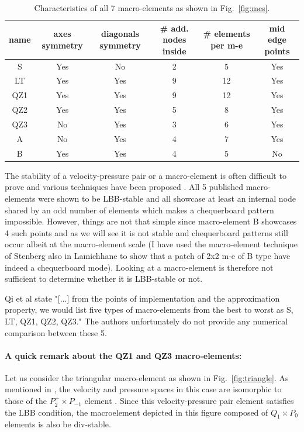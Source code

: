 \documentclass[a4paper]{article}
\begin{document}
\begin{table}
\centering
\begin{tabular}{cccccc}
\hline
{name} & {axes symmetry}  & {diagonals symmetry} & {\# add. nodes inside} 
& {\# elements per m-e} & {mid edge points}  \\
\hline
\hline
S   &  Yes &   No & 2  & 5 & Yes \\
LT  &  Yes &  Yes & 9 & 12 & Yes \\
QZ1 &  Yes &  Yes & 9 & 12 & Yes \\
QZ2 &  Yes &  Yes & 5 & 8  & Yes \\
QZ3 &  No  &  Yes & 3 & 6  & Yes \\
A   &  No  &  Yes & 4 & 7  & Yes \\
B   &  Yes &  Yes & 4 & 5  & No  \\
\hline
\end{tabular}
\caption{Characteristics of all 7 macro-elements as shown in Fig.~\ref{fig:mes}.\label{tab1}}%
\end{table}


The stability of a velocity-pressure pair or a macro-element is often difficult to prove 
and various techniques have been proposed \cite{bobf13}. 
All 5 published macro-elements were shown to be LBB-stable and all showcase at least 
an internal node shared by an odd number of elements which makes a chequerboard pattern impossible. 
However, things are not that simple since macro-element B showcases 
4 such points and as we will see it is not stable and chequerboard patterns still occur 
albeit at the macro-element scale (I have used the macro-element technique of Stenberg 
also in Lamichhane to show that a patch of 2x2 m-e of B type have indeed a chequerboard mode).
Looking at a macro-element is therefore not sufficient to determine whether it is LBB-stable or not. 

Qi et al \cite{qizh07} state "[...] from the points of implementation and the approximation property, we 
would list five types of macro-elements from the best to worst as S, LT, QZ1, QZ2, QZ3." 
The authors unfortunately do not provide any numerical comparison between these 5. 

\paragraph{A quick remark about the QZ1 and QZ3 macro-elements:}
Let us consider the triangular macro-element as shown in Fig.~\ref{fig:triangle}.
As mentioned in \cite{rovira1992}, 
the velocity and pressure spaces in this case are isomorphic to those
of the $P_2^+ \times P_{-1}$ element \cite{thba25}. Since this velocity-pressure pair 
element satisfies the LBB condition, the macroelement depicted in this figure
composed of $Q_1 \times P_0$ elements is also be div-stable.
\end{document}
